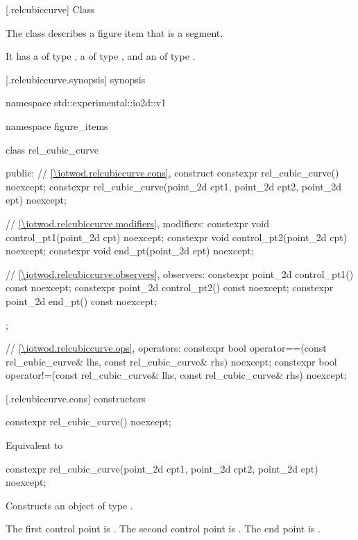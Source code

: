  [\iotwod.relcubiccurve] {Class }

\pnum
{}%
The class  describes a figure item that is a segment.

\pnum
It has a  of type , a  of type , and an  of type .

 [\iotwod.relcubiccurve.synopsis] { synopsis}

\begin{codeblock}
namespace std::experimental::io2d::v1 {
  namespace figure_items {
    class rel_cubic_curve {
    public:
      // \ref{\iotwod.relcubiccurve.cons}, construct
      constexpr rel_cubic_curve() noexcept;
      constexpr rel_cubic_curve(point_2d cpt1, point_2d cpt2,
        point_2d ept) noexcept;

      // \ref{\iotwod.relcubiccurve.modifiers}, modifiers:
      constexpr void control_pt1(point_2d cpt) noexcept;
      constexpr void control_pt2(point_2d cpt) noexcept;
      constexpr void end_pt(point_2d ept) noexcept;

      // \ref{\iotwod.relcubiccurve.observers}, observers:
      constexpr point_2d control_pt1() const noexcept;
      constexpr point_2d control_pt2() const noexcept;
      constexpr point_2d end_pt() const noexcept;
    };
    
    // \ref{\iotwod.relcubiccurve.ops}, operators:
    constexpr bool operator==(const rel_cubic_curve& lhs,
      const rel_cubic_curve& rhs) noexcept;
    constexpr bool operator!=(const rel_cubic_curve& lhs,
      const rel_cubic_curve& rhs) noexcept;
  }
}
\end{codeblock}

 [\iotwod.relcubiccurve.cons] { constructors}

%
\begin{itemdecl}
constexpr rel_cubic_curve() noexcept;
\end{itemdecl}
\begin{itemdescr}
\pnum
\effects
Equivalent to 
\end{itemdescr}

%
\begin{itemdecl}
constexpr rel_cubic_curve(point_2d cpt1, point_2d cpt2,
  point_2d ept) noexcept;
\end{itemdecl}
\begin{itemdescr}
\pnum
\effects
Constructs an object of type .

\pnum
The first control point is . The second control point is . The end point is .
\end{itemdescr}

